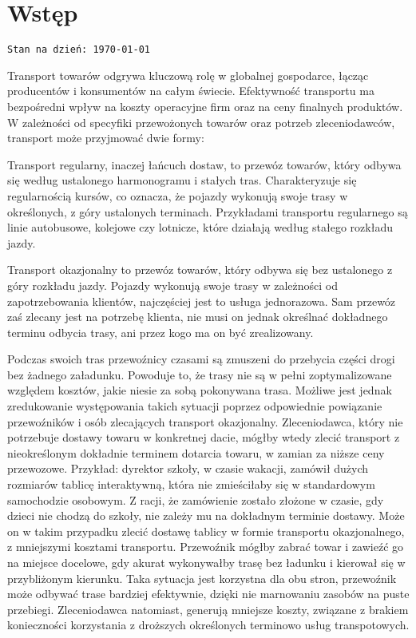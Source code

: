 \chapter{Wstęp}
\texttt{Stan na dzień: \today}

Transport towarów odgrywa kluczową rolę w globalnej gospodarce, łącząc producentów i konsumentów na całym świecie. Efektywność transportu ma bezpośredni wpływ na koszty operacyjne firm oraz na ceny finalnych produktów. W zależności od specyfiki przewożonych towarów oraz potrzeb zleceniodawców, transport może przyjmować dwie formy:

\label{sec:przewoz_regularny}
Transport regularny, inaczej łańcuch dostaw, to przewóz towarów, który odbywa się według ustalonego harmonogramu i stałych tras. Charakteryzuje się regularnością kursów, co oznacza, że pojazdy wykonują swoje trasy w określonych, z góry ustalonych terminach. Przykładami transportu regularnego są linie autobusowe, kolejowe czy lotnicze, które działają według stałego rozkładu jazdy.

\label{sec:transport_okazjonalny}
Transport okazjonalny to przewóz towarów, który odbywa się bez ustalonego z góry rozkładu jazdy. Pojazdy wykonują swoje trasy w zależności od zapotrzebowania klientów, najczęściej jest to usługa jednorazowa. Sam przewóz zaś zlecany jest na potrzebę klienta, nie musi on jednak określnać dokładnego terminu odbycia trasy, ani przez kogo ma on być zrealizowany.

Podczas swoich tras przewoźnicy czasami są zmuszeni do przebycia części drogi bez żadnego załadunku. Powoduje to, że trasy nie są w pełni zoptymalizowane względem kosztów, jakie niesie za sobą pokonywana trasa. Możliwe jest jednak zredukowanie występowania takich sytuacji poprzez odpowiednie powiązanie przewoźników i osób zlecających transport okazjonalny. Zleceniodawca, który nie potrzebuje dostawy towaru w konkretnej dacie, mógłby wtedy zlecić transport z nieokreślonym dokładnie terminem dotarcia towaru, w zamian za niższe ceny przewozowe. Przykład: dyrektor szkoły, w czasie wakacji, zamówił dużych rozmiarów tablicę interaktywną, która nie zmieściłaby się w standardowym samochodzie osobowym. Z racji, że zamówienie zostało złożone w czasie, gdy dzieci nie chodzą do szkoły, nie zależy mu na dokładnym terminie dostawy. Może on w takim przypadku zlecić dostawę tablicy w formie transportu okazjonalnego, z mniejszymi kosztami transportu. Przewoźnik mógłby zabrać towar i zawieźć go na miejsce docelowe, gdy akurat wykonywałby trasę bez ładunku i kierował się w przybliżonym kierunku. Taka sytuacja jest korzystna dla obu stron, przewoźnik może odbywać trase bardziej efektywnie, dzięki nie marnowaniu zasobów na puste przebiegi. Zleceniodawca natomiast, generują mniejsze koszty, związane z brakiem konieczności korzystania z droższych określonych terminowo usług transpotowych.

